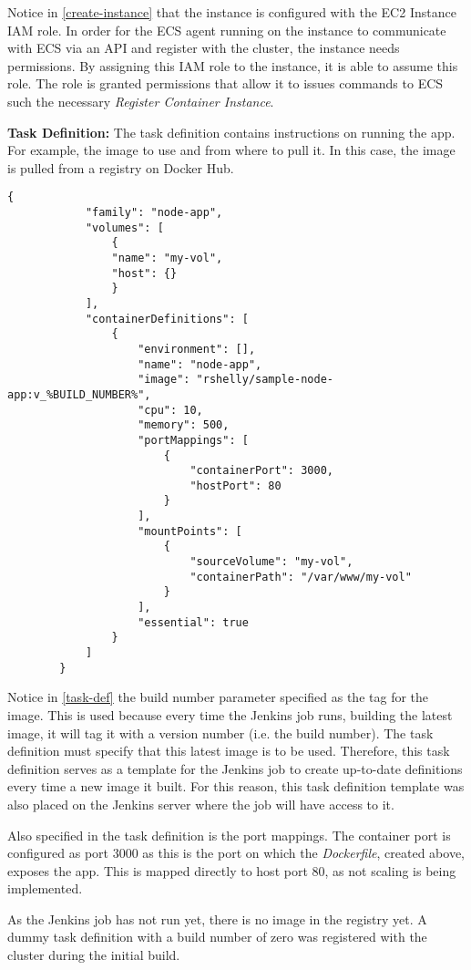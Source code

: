 	Notice in \autoref{create-instance} that the instance is configured with the EC2 Instance IAM role. In order for the ECS agent running on the instance to communicate with ECS via an API and register with the cluster, the instance needs permissions. By assigning this IAM role to the instance, it is able to assume this role. The role is granted permissions that allow it to issues commands to ECS such the necessary \textit{Register Container Instance}.
	
	\medbreak
	\noindent \textbf{Task Definition:}	The task definition contains instructions on running the app. For example, the image to use and from where to pull it. In this case, the image is pulled from a registry on Docker Hub.
	
	\begin{minipage}{\textwidth}
		\begin{lstlisting}[caption={Task Definition Template},label=task-def]
		{
			"family": "node-app",
			"volumes": [
				{
				"name": "my-vol",
				"host": {}
				}
			],
			"containerDefinitions": [
				{
					"environment": [],
					"name": "node-app",
					"image": "rshelly/sample-node-app:v_%BUILD_NUMBER%",
					"cpu": 10,
					"memory": 500,
					"portMappings": [
						{
							"containerPort": 3000,
							"hostPort": 80
						}
					],
					"mountPoints": [
						{
							"sourceVolume": "my-vol",
							"containerPath": "/var/www/my-vol"
						}
					],
					"essential": true
				}
			]
		}	
		\end{lstlisting}
	\end{minipage}
	
	Notice in \autoref{task-def} the build number parameter specified as the tag for the image. This is used because every time the Jenkins job runs, building the latest image, it will tag it with a version number (i.e. the build number). The task definition must specify that this latest image is to be used. Therefore, this task definition serves as a template for the Jenkins job to create up-to-date definitions every time a new image it built. For this reason, this task definition template was also placed on the Jenkins server where the job will have access to it.
	
	Also specified in the task definition is the port mappings. The container port is configured as port 3000 as this is the port on which the \textit{Dockerfile}, created above, exposes the app. This is mapped directly to host port 80, as not scaling is being implemented.
	
	As the Jenkins job has not run yet, there is no image in the registry yet. A dummy task definition with a build number of zero was registered with the cluster during the initial build.
	
